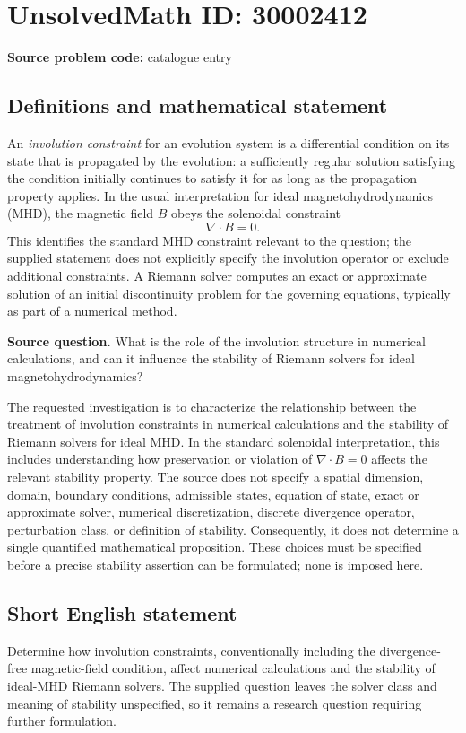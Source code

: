 \documentclass[11pt]{article}
\begin{document}
\section*{UnsolvedMath ID: 30002412}
\textbf{Source problem code:} catalogue entry
\subsection{Definitions and mathematical statement}
An \emph{involution constraint} for an evolution system is a differential condition on its state that is propagated by the evolution: a sufficiently regular solution satisfying the condition initially continues to satisfy it for as long as the propagation property applies. In the usual interpretation for ideal magnetohydrodynamics (MHD), the magnetic field \(B\) obeys the solenoidal constraint
\[
\nabla\cdot B=0.
\]
This identifies the standard MHD constraint relevant to the question; the supplied statement does not explicitly specify the involution operator or exclude additional constraints. A Riemann solver computes an exact or approximate solution of an initial discontinuity problem for the governing equations, typically as part of a numerical method.

\textbf{Source question.} What is the role of the involution structure in numerical calculations, and can it influence the stability of Riemann solvers for ideal magnetohydrodynamics?

The requested investigation is to characterize the relationship between the treatment of involution constraints in numerical calculations and the stability of Riemann solvers for ideal MHD. In the standard solenoidal interpretation, this includes understanding how preservation or violation of \(\nabla\cdot B=0\) affects the relevant stability property. The source does not specify a spatial dimension, domain, boundary conditions, admissible states, equation of state, exact or approximate solver, numerical discretization, discrete divergence operator, perturbation class, or definition of stability. Consequently, it does not determine a single quantified mathematical proposition. These choices must be specified before a precise stability assertion can be formulated; none is imposed here.
\subsection{Short English statement}
Determine how involution constraints, conventionally including the divergence-free magnetic-field condition, affect numerical calculations and the stability of ideal-MHD Riemann solvers. The supplied question leaves the solver class and meaning of stability unspecified, so it remains a research question requiring further formulation.
\end{document}
